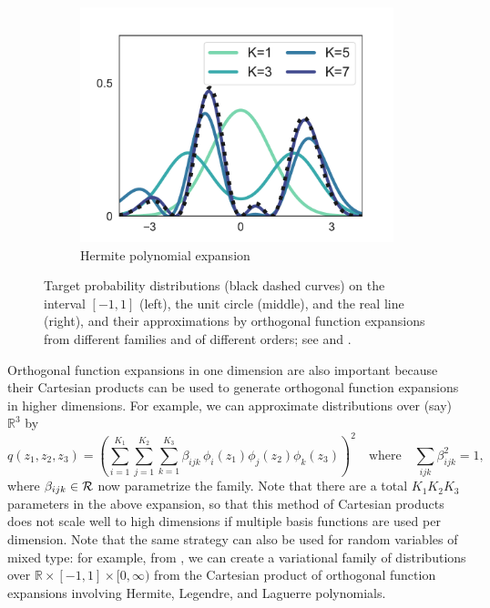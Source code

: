 \begin{figure}[t]
\begin{subfigure}[b]{0.325\linewidth}
    \includegraphics[scale=0.31]{figs/1d_hermite2.pdf}
    \caption{Hermite polynomial expansion}
    \label{fig:onedim:c}
\end{subfigure}
\caption{Target probability distributions (black dashed curves) on the interval $[-1,1]$ (left), the unit circle (middle), and the
    real line (right), and their approximations by orthogonal function expansions
    from different families and of different orders; see  and .}
\vspace{-15pt}
\label{fig:onedim}
\end{figure}


Orthogonal function expansions in one dimension are also important because their Cartesian products can be used to generate orthogonal function expansions in higher dimensions. For example, we can approximate distributions over (say) $\mathbb{R}^3$ by
\begin{equation}
q(z_1,z_2,z_3) =  \left(\sum_{i=1}^{K_1}\sum_{j=1}^{K_2}\sum_{k=1}^{K_3} \beta_{ijk}\, \phi_i(z_1)\phi_j(z_2)\phi_k(z_3)\right)^2\quad\mbox{where}\quad \sum_{ijk}\beta^2_{ijk} = 1,
\label{eq:3d}
\end{equation}
where $\beta_{ijk}\in \mathcal{R}$ now parametrize the family.
Note that there are a total $K_1 K_2 K_3$ parameters in the above expansion, so that this method of
Cartesian products does not scale well to high dimensions if multiple basis functions are used per
dimension.
Note that the same strategy can also be used for random variables of
mixed type: for example, from , we can create a variational family of distributions over $\mathbb{R}\!\times\![-1,1]\!\times\![0,\infty)$ from the Cartesian product of orthogonal function expansions involving Hermite, Legendre, and Laguerre polynomials.

